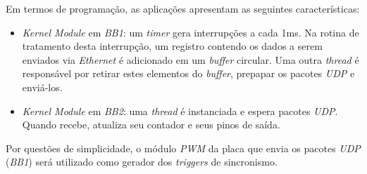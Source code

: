 \vspace{12pt}

Em termos de programação, as aplicações apresentam as seguintes características:

\begin{itemize} \renewcommand\labelitemi{--}
  \item \textit{Kernel Module} em \textit{BB1}: um \textit{timer} gera
  interrupções a cada 1ms. Na rotina de tratamento desta interrupção, um
  registro contendo os dados a serem enviados via \textit{Ethernet} é
  adicionado em um \textit{buffer} circular. Uma outra \textit{thread}
  é responsável por retirar estes elementos do \textit{buffer}, prepapar os
  pacotes \textit{UDP} e enviá-los.

  \item \textit{Kernel Module} em \textit{BB2}: uma \textit{thread} é
  instanciada e espera pacotes \textit{UDP}. Quando recebe, atualiza seu
  contador e seus pinos de saída.
\end{itemize}

Por questões de simplicidade, o módulo \textit{PWM} da placa que envia os
pacotes \textit{UDP} (\textit{BB1}) será utilizado como gerador dos
\textit{triggers} de sincronismo. 

